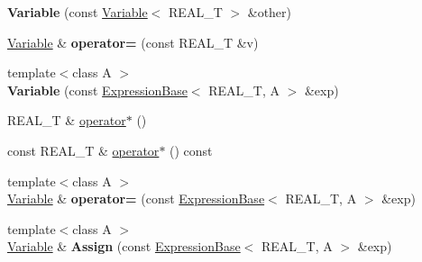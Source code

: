 \begin{DoxyCompactItemize}
\item 
\hypertarget{structatl_1_1_variable_a64f472f5f036b681d9e9b35f3de96a1e}{{\bfseries Variable} (const \hyperlink{structatl_1_1_variable}{Variable}$<$ R\+E\+A\+L\+\_\+\+T $>$ \&other)}\label{structatl_1_1_variable_a64f472f5f036b681d9e9b35f3de96a1e}

\item 
\hypertarget{structatl_1_1_variable_a6237645a2e54443ec0c101d089c5f834}{\hyperlink{structatl_1_1_variable}{Variable} \& {\bfseries operator=} (const R\+E\+A\+L\+\_\+\+T \&v)}\label{structatl_1_1_variable_a6237645a2e54443ec0c101d089c5f834}

\item 
\hypertarget{structatl_1_1_variable_a900d049c0f459456bd19f2bdbbb76ab3}{{\footnotesize template$<$class A $>$ }\\{\bfseries Variable} (const \hyperlink{structatl_1_1_expression_base}{Expression\+Base}$<$ R\+E\+A\+L\+\_\+\+T, A $>$ \&exp)}\label{structatl_1_1_variable_a900d049c0f459456bd19f2bdbbb76ab3}

\item 
R\+E\+A\+L\+\_\+\+T \& \hyperlink{structatl_1_1_variable_a6a78210005f19418b6a97745dacdb37b}{operator$\ast$} ()
\item 
const R\+E\+A\+L\+\_\+\+T \& \hyperlink{structatl_1_1_variable_a8ab38ec15b81342e5c5f5611dcc5888a}{operator$\ast$} () const 
\item 
\hypertarget{structatl_1_1_variable_abfa1e5ed61daa1b25668f3afd1bfd125}{{\footnotesize template$<$class A $>$ }\\\hyperlink{structatl_1_1_variable}{Variable} \& {\bfseries operator=} (const \hyperlink{structatl_1_1_expression_base}{Expression\+Base}$<$ R\+E\+A\+L\+\_\+\+T, A $>$ \&exp)}\label{structatl_1_1_variable_abfa1e5ed61daa1b25668f3afd1bfd125}

\item 
\hypertarget{structatl_1_1_variable_aad92665db0c50f28a772d22d23cb5e83}{{\footnotesize template$<$class A $>$ }\\\hyperlink{structatl_1_1_variable}{Variable} \& {\bfseries Assign} (const \hyperlink{structatl_1_1_expression_base}{Expression\+Base}$<$ R\+E\+A\+L\+\_\+\+T, A $>$ \&exp)}\label{structatl_1_1_variable_aad92665db0c50f28a772d22d23cb5e83}


\end{DoxyCompactItemize}
